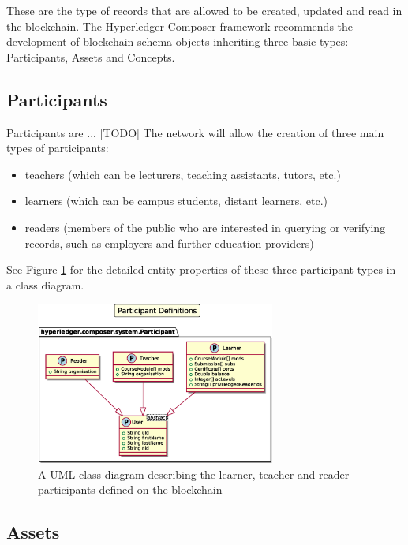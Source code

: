 These are the type of records that are allowed to be created, updated and read in the blockchain. 
The Hyperledger Composer framework recommends the development of blockchain schema objects 
inheriting three basic types: Participants, Assets and Concepts.

\subsection{Participants}

Participants are ... [TODO]
The network will allow the creation of three main types of participants: 
\begin{itemize}
    \setlength\itemsep{0em}    
    \item teachers (which can be lecturers, teaching assistants, tutors, etc.)
    \item learners (which can be campus students, distant learners, etc.)
    \item readers (members of the public who are interested in querying or verifying records, 
    such as employers and further education providers)
\end{itemize}

See Figure \ref{fig:participants} for the detailed entity properties of these three participant types 
in a class diagram.

\begin{figure}[!ht] 
    \centering    
    \includegraphics[width=0.7\textwidth]{participants}
    \caption[Participants Class Diagram]
        {A UML class diagram describing the learner, teacher and reader participants defined on the blockchain} 
    \label{fig:participants}
\end{figure}

\subsection{Assets}

